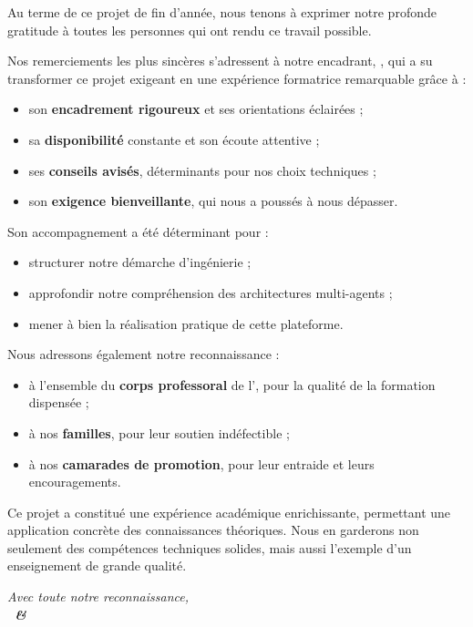 Au terme de ce projet de fin d'année, nous tenons à exprimer notre profonde
gratitude à toutes les personnes qui ont rendu ce travail possible.

Nos remerciements les plus sincères s'adressent à notre encadrant,
\textbf{\monencadrant}, qui a su transformer ce projet exigeant en une
expérience formatrice remarquable grâce à :
\begin{itemize}
  \item son \textbf{encadrement rigoureux} et ses orientations éclairées ;
  \item sa \textbf{disponibilité} constante et son écoute attentive ;
  \item ses \textbf{conseils avisés}, déterminants pour nos choix techniques ;
  \item son \textbf{exigence bienveillante}, qui nous a poussés à nous dépasser.
\end{itemize}

Son accompagnement a été déterminant pour :
\begin{itemize}
  \item structurer notre démarche d'ingénierie ;
  \item approfondir notre compréhension des architectures multi-agents ;
  \item mener à bien la réalisation pratique de cette plateforme.
\end{itemize}

Nous adressons également notre reconnaissance :
\begin{itemize}
  \item à l'ensemble du \textbf{corps professoral} de l'\monetablissement,
        pour la qualité de la formation dispensée ;
  \item à nos \textbf{familles}, pour leur soutien indéfectible ;
  \item à nos \textbf{camarades de promotion}, pour leur entraide et leurs
        encouragements.
\end{itemize}

Ce projet a constitué une expérience académique enrichissante, permettant une
application concrète des connaissances théoriques. Nous en garderons non
seulement des compétences techniques solides, mais aussi l'exemple d'un
enseignement de grande qualité.

\vspace{0.8cm}
\begin{flushright}\itshape
Avec toute notre reconnaissance,\\[6pt]
\textbf{\auteurun\ \& \auteurdeux}
\end{flushright}

